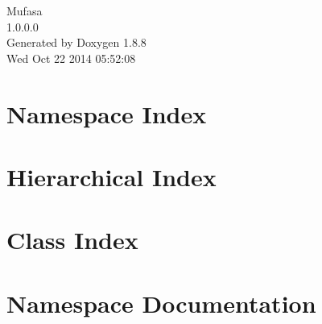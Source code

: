 \documentclass[twoside]{book}
\newcommand{\+}{\discretionary{\mbox{\scriptsize$\hookleftarrow$}}{}{}}
\newcommand{\clearemptydoublepage}{%
  \newpage{\pagestyle{empty}\cleardoublepage}%
}
\begin{document}
\hypersetup{pageanchor=false,
             bookmarks=true,
             bookmarksnumbered=true,
             pdfencoding=unicode
            }
\begin{titlepage}
\vspace*{7cm}
\begin{center}%
{\Large Mufasa \\[1ex]\large 1.\+0.\+0.\+0 }\\
\vspace*{1cm}
{\large Generated by Doxygen 1.8.8}\\
\vspace*{0.5cm}
{\small Wed Oct 22 2014 05:52:08}\\
\end{center}
\end{titlepage}
\clearemptydoublepage
\tableofcontents
\clearemptydoublepage
{}
\hypersetup{pageanchor=true}

\chapter{Namespace Index}

\chapter{Hierarchical Index}

\chapter{Class Index}

\chapter{Namespace Documentation}







\end{document}
